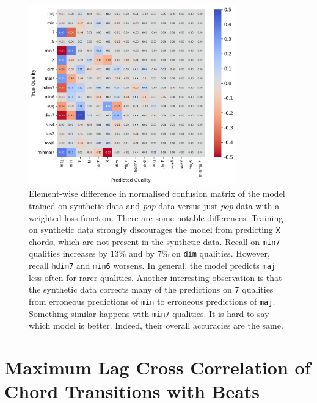 \begin{figure}[H]
    \centering
    \includegraphics[width=0.8\textwidth]{figures/confusion_matrix_synth.png}
    \caption{Element-wise difference in normalised confusion matrix of the model trained on synthetic data and \emph{pop} data versus just \emph{pop} data with a weighted loss function. There are some notable differences. Training on synthetic data strongly discourages the model from predicting \texttt{X} chords, which are not present in the synthetic data. Recall on \texttt{min7} qualities increases by $13\%$ and by $7\%$ on \texttt{dim} qualities. However, recall \texttt{hdim7} and \texttt{min6} worsens. In general, the model predicts \texttt{maj} less often for rarer qualities. Another interesting observation is that the synthetic data corrects many of the predictions on \texttt{7} qualities from erroneous predictions of \texttt{min} to erroneous predictions of \texttt{maj}. Something similar happens with \texttt{min7} qualities. It is hard to say which model is better. Indeed, their overall accuracies are the same.}\label{fig:cm_synthetic_data}
\end{figure}

\section{Maximum Lag Cross Correlation of Chord Transitions with Beats}\label{app:maximum_lag_cross_correlation}

